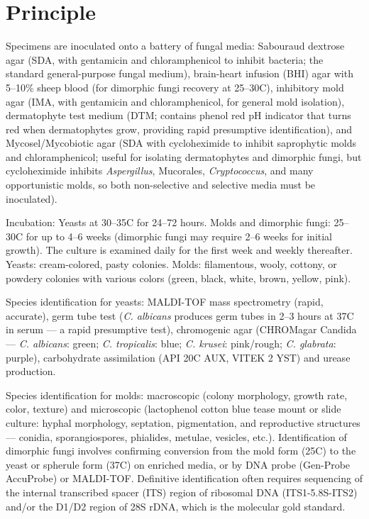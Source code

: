 \section*{Principle}
Specimens are inoculated onto a battery of fungal media: Sabouraud dextrose agar (SDA, with gentamicin and chloramphenicol to inhibit bacteria; the standard general-purpose fungal medium), brain-heart infusion (BHI) agar with 5--10\% sheep blood (for dimorphic fungi recovery at 25--30\textdegree{}C), inhibitory mold agar (IMA, with gentamicin and chloramphenicol, for general mold isolation), dermatophyte test medium (DTM; contains phenol red pH indicator that turns red when dermatophytes grow, providing rapid presumptive identification), and Mycosel/Mycobiotic agar (SDA with cycloheximide to inhibit saprophytic molds and chloramphenicol; useful for isolating dermatophytes and dimorphic fungi, but cycloheximide inhibits \textit{Aspergillus}, Mucorales, \textit{Cryptococcus}, and many opportunistic molds, so both non-selective and selective media must be inoculated).

Incubation: Yeasts at 30--35\textdegree{}C for 24--72 hours. Molds and dimorphic fungi: 25--30\textdegree{}C for up to 4--6 weeks (dimorphic fungi may require 2--6 weeks for initial growth). The culture is examined daily for the first week and weekly thereafter. Yeasts: cream-colored, pasty colonies. Molds: filamentous, wooly, cottony, or powdery colonies with various colors (green, black, white, brown, yellow, pink).

Species identification for yeasts: MALDI-TOF mass spectrometry (rapid, accurate), germ tube test (\textit{C. albicans} produces germ tubes in 2--3 hours at 37\textdegree{}C in serum --- a rapid presumptive test), chromogenic agar (CHROMagar Candida --- \textit{C. albicans}: green; \textit{C. tropicalis}: blue; \textit{C. krusei}: pink/rough; \textit{C. glabrata}: purple), carbohydrate assimilation (API 20C AUX, VITEK 2 YST) and urease production.

Species identification for molds: macroscopic (colony morphology, growth rate, color, texture) and microscopic (lactophenol cotton blue tease mount or slide culture: hyphal morphology, septation, pigmentation, and reproductive structures --- conidia, sporangiospores, phialides, metulae, vesicles, etc.). Identification of dimorphic fungi involves confirming conversion from the mold form (25\textdegree{}C) to the yeast or spherule form (37\textdegree{}C) on enriched media, or by DNA probe (Gen-Probe AccuProbe) or MALDI-TOF. Definitive identification often requires sequencing of the internal transcribed spacer (ITS) region of ribosomal DNA (ITS1-5.8S-ITS2) and/or the D1/D2 region of 28S rDNA, which is the molecular gold standard.

